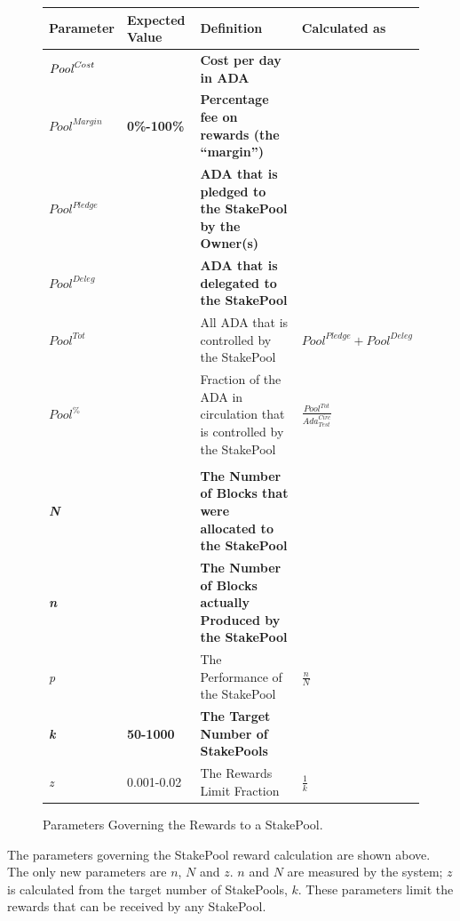 \documentclass[11pt,a4paper,dvipsnames,twosided,final]{article}
\newcommand{\khcomment}[1]{\todo[color=blue!20]{KH: #1}}
\newcommand{\ada}{ADA{}}
\begin{document}
\begin{figure}[h!]
\begin{center}
\begin{tabular}{||l|l|p{6cm}|l||}
  \hline \hline
\textbf{Parameter} & \textbf{Expected Value} & \textbf{Definition} & \textbf{Calculated as} \\\hline
  \textbf{\color{red} $\textit{\textit{Pool}}^{\textit{Cost}}$} &  & \textbf{\color{red} Cost per day in \ada{}} & \\\hline
\textbf{\color{red} ${\textit{Pool}}^{\textit{Margin}}$} &  \textbf{\color{red} 0\%-100\%} & \textbf{\color{red} Percentage fee on rewards (the ``margin'')} & \\\hline
\textbf{\color{red} ${\textit{Pool}}^\textit{Pledge}$} & & \textbf{\color{red} \ada{} that is pledged to the StakePool by the Owner(s)} & \\\hline
\textbf{\color{blue} ${\textit{Pool}}^\textit{Deleg}$} & & \textbf{\color{blue} \ada{} that is delegated to the StakePool} & \\\hline
${\textit{Pool}}^{Tot}$ & & All \ada{} that is controlled by the StakePool & ${\textit{Pool}}^\textit{Pledge} + {\textit{Pool}}^\textit{Deleg}$ \\\hline
  ${\textit{Pool}}^\%$ & & Fraction of the \ada{} in circulation that is controlled by the StakePool & {\large $\frac{{\textit{Pool}}^{Tot}}{\textit{Ada}^{\textit{Circ}}_{\textit{Test}}}$} \\\hline
&&&  \\\hline
\textbf{\color{cyan} \emph{N}} & & \textbf{\color{cyan} The Number of Blocks that were allocated to the StakePool} & \\\hline
\textbf{\color{cyan} \emph{n}} & & \textbf{\color{cyan} The Number of Blocks actually Produced by the StakePool} & \\\hline
\emph{p} & & The Performance of the StakePool & $\frac{n}{N}$ \\\hline
\textbf{\color{green} \emph{k}} &\textbf{\color{green} 50-1000} & \textbf{\color{green} The Target Number of StakePools} & \\\hline
\emph{z} & 0.001-0.02 & The Rewards Limit Fraction & $\frac{1}{k}$ \\\hline
\hline
\end{tabular}
\end{center}
\caption{Parameters Governing the Rewards to a StakePool.}
\label{fig:rewards}
\end{figure}

\noindent
The parameters governing the StakePool reward calculation are shown above.  The only new
parameters are $n$, $N$ and $z$. $n$ and $N$ are measured by the system; $z$ is calculated from the
target number of StakePools, $k$.  These parameters limit the rewards that can be received by any StakePool.
\end{document}
